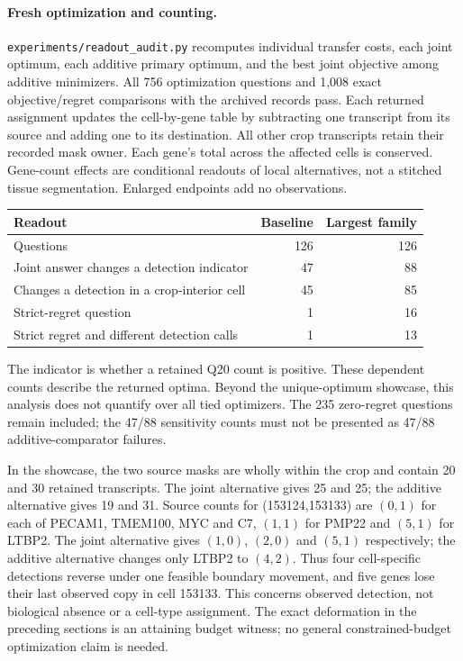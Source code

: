 \documentclass[10pt,letterpaper]{article}
\begin{document}
\paragraph{Fresh optimization and counting.}
\texttt{experiments/readout\_audit.py} recomputes individual transfer costs, each joint optimum, each additive primary optimum, and the best joint objective among additive minimizers. All 756 optimization questions and 1,008 exact objective/regret comparisons with the archived records pass. Each returned assignment updates the cell-by-gene table by subtracting one transcript from its source and adding one to its destination. All other crop transcripts retain their recorded mask owner. Each gene's total across the affected cells is conserved. Gene-count effects are conditional readouts of local alternatives, not a stitched tissue segmentation. Enlarged endpoints add no observations.

\begin{center}\begin{tabular}{lrr}\toprule
Readout & Baseline & Largest family\\\midrule
Questions &126&126\\
Joint answer changes a detection indicator &47&88\\
Changes a detection in a crop-interior cell &45&85\\
Strict-regret question &1&16\\
Strict regret and different detection calls &1&13\\\bottomrule
\end{tabular}\end{center}

The indicator is whether a retained Q20 count is positive. These dependent counts describe the returned optima. Beyond the unique-optimum showcase, this analysis does not quantify over all tied optimizers. The 235 zero-regret questions remain included; the 47/88 sensitivity counts must not be presented as 47/88 additive-comparator failures.

In the showcase, the two source masks are wholly within the crop and contain 20 and 30 retained transcripts. The joint alternative gives 25 and 25; the additive alternative gives 19 and 31. Source counts for (153124,153133) are $(0,1)$ for each of PECAM1, TMEM100, MYC and C7, $(1,1)$ for PMP22 and $(5,1)$ for LTBP2. The joint alternative gives $(1,0)$, $(2,0)$ and $(5,1)$ respectively; the additive alternative changes only LTBP2 to $(4,2)$. Thus four cell-specific detections reverse under one feasible boundary movement, and five genes lose their last observed copy in cell 153133. This concerns observed detection, not biological absence or a cell-type assignment. The exact deformation in the preceding sections is an attaining budget witness; no general constrained-budget optimization claim is needed.
\end{document}
